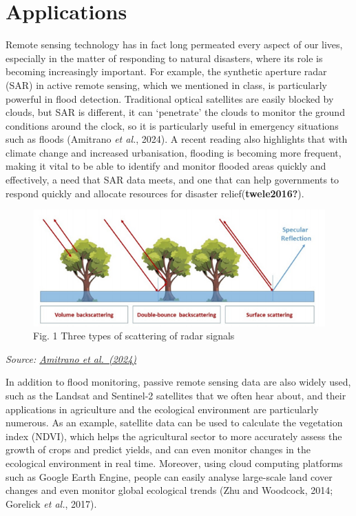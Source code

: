 \documentclass[
  letterpaper,
  DIV=11,
  numbers=noendperiod]{scrreprt}
\begin{document}
\section*{Applications}\label{applications}


Remote sensing technology has in fact long permeated every aspect of our
lives, especially in the matter of responding to natural disasters,
where its role is becoming increasingly important. For example, the
synthetic aperture radar (SAR) in active remote sensing, which we
mentioned in class, is particularly powerful in flood detection.
Traditional optical satellites are easily blocked by clouds, but SAR is
different, it can `penetrate' the clouds to monitor the ground
conditions around the clock, so it is particularly useful in emergency
situations such as floods (Amitrano \emph{et al.}, 2024). A recent
reading also highlights that with climate change and increased
urbanisation, flooding is becoming more frequent, making it vital to be
able to identify and monitor flooded areas quickly and effectively, a
need that SAR data meets, and one that can help governments to respond
quickly and allocate resources for disaster relief(\textbf{twele2016?}).

\begin{figure}[H]

{\centering \includegraphics[width=0.7\linewidth,height=\textheight,keepaspectratio]{images/flood.png}

}

\caption{Fig. 1 Three types of scattering of radar signals}

\end{figure}%

\emph{Source: \href{https://doi.org/10.3390/rs16040656}{Amitrano et
al.~(2024)}}

In addition to flood monitoring, passive remote sensing data are also
widely used, such as the Landsat and Sentinel-2 satellites that we often
hear about, and their applications in agriculture and the ecological
environment are particularly numerous. As an example, satellite data can
be used to calculate the vegetation index (NDVI), which helps the
agricultural sector to more accurately assess the growth of crops and
predict yields, and can even monitor changes in the ecological
environment in real time. Moreover, using cloud computing platforms such
as Google Earth Engine, people can easily analyse large-scale land cover
changes and even monitor global ecological trends (Zhu and Woodcock,
2014; Gorelick \emph{et al.}, 2017).
\end{document}
